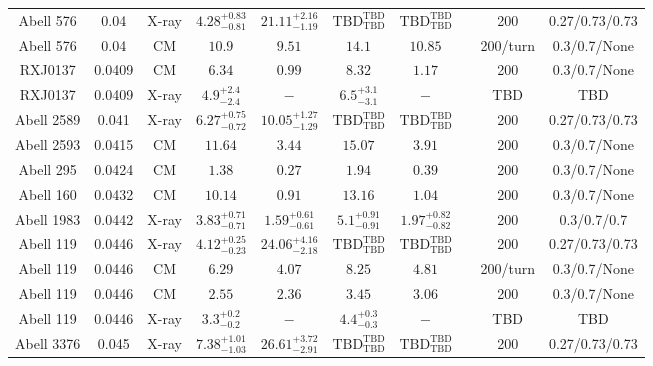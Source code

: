 \begin{table}
\begin{tabular}{cccccccccc}
Abell 576 & 0.04 & X-ray & ${4.28}^{+0.83}_{-0.81}$ & ${21.11}^{+2.16}_{-1.19}$ & ${\mathrm{TBD}}^{\mathrm{TBD}}_{\mathrm{TBD}}$ & ${\mathrm{TBD}}^{\mathrm{TBD}}_{\mathrm{TBD}}$ & \citet{BA14.1} & 200 & 0.27/0.73/0.73 \\
Abell 576 & 0.04 & CM & ${10.9}^{}_{}$ & ${9.51}^{}_{}$ & ${14.1}^{}_{}$ & ${10.85}^{}_{}$ & \citet{RI03.1} & 200/turn & 0.3/0.7/None \\
RXJ0137 & 0.0409 & CM & ${6.34}^{}_{}$ & ${0.99}^{}_{}$ & ${8.32}^{}_{}$ & ${1.17}^{}_{}$ & \citet{RI06.1} & 200 & 0.3/0.7/None \\
RXJ0137 & 0.0409 & X-ray & ${4.9}^{+2.4}_{-2.4}$ & ${-}^{}_{}$ & ${6.5}^{+3.1}_{-3.1}$ & ${-}^{}_{}$ & \citet{BU04.1} & TBD & TBD \\
Abell 2589 & 0.041 & X-ray & ${6.27}^{+0.75}_{-0.72}$ & ${10.05}^{+1.27}_{-1.29}$ & ${\mathrm{TBD}}^{\mathrm{TBD}}_{\mathrm{TBD}}$ & ${\mathrm{TBD}}^{\mathrm{TBD}}_{\mathrm{TBD}}$ & \citet{BA14.1} & 200 & 0.27/0.73/0.73 \\
Abell 2593 & 0.0415 & CM & ${11.64}^{}_{}$ & ${3.44}^{}_{}$ & ${15.07}^{}_{}$ & ${3.91}^{}_{}$ & \citet{RI06.1} & 200 & 0.3/0.7/None \\
Abell 295 & 0.0424 & CM & ${1.38}^{}_{}$ & ${0.27}^{}_{}$ & ${1.94}^{}_{}$ & ${0.39}^{}_{}$ & \citet{RI06.1} & 200 & 0.3/0.7/None \\
Abell 160 & 0.0432 & CM & ${10.14}^{}_{}$ & ${0.91}^{}_{}$ & ${13.16}^{}_{}$ & ${1.04}^{}_{}$ & \citet{RI06.1} & 200 & 0.3/0.7/None \\
Abell 1983 & 0.0442 & X-ray & ${3.83}^{+0.71}_{-0.71}$ & ${1.59}^{+0.61}_{-0.61}$ & ${5.1}^{+0.91}_{-0.91}$ & ${1.97}^{+0.82}_{-0.82}$ & \citet{PO05.1} & 200 & 0.3/0.7/0.7 \\
Abell 119 & 0.0446 & X-ray & ${4.12}^{+0.25}_{-0.23}$ & ${24.06}^{+4.16}_{-2.18}$ & ${\mathrm{TBD}}^{\mathrm{TBD}}_{\mathrm{TBD}}$ & ${\mathrm{TBD}}^{\mathrm{TBD}}_{\mathrm{TBD}}$ & \citet{BA14.1} & 200 & 0.27/0.73/0.73 \\
Abell 119 & 0.0446 & CM & ${6.29}^{}_{}$ & ${4.07}^{}_{}$ & ${8.25}^{}_{}$ & ${4.81}^{}_{}$ & \citet{RI03.1} & 200/turn & 0.3/0.7/None \\
Abell 119 & 0.0446 & CM & ${2.55}^{}_{}$ & ${2.36}^{}_{}$ & ${3.45}^{}_{}$ & ${3.06}^{}_{}$ & \citet{RI06.1} & 200 & 0.3/0.7/None \\
Abell 119 & 0.0446 & X-ray & ${3.3}^{+0.2}_{-0.2}$ & ${-}^{}_{}$ & ${4.4}^{+0.3}_{-0.3}$ & ${-}^{}_{}$ & \citet{XU01.1} & TBD & TBD \\
Abell 3376 & 0.045 & X-ray & ${7.38}^{+1.01}_{-1.03}$ & ${26.61}^{+3.72}_{-2.91}$ & ${\mathrm{TBD}}^{\mathrm{TBD}}_{\mathrm{TBD}}$ & ${\mathrm{TBD}}^{\mathrm{TBD}}_{\mathrm{TBD}}$ & \citet{BA14.1} & 200 & 0.27/0.73/0.73 \\

\end{tabular}
\end{table}
